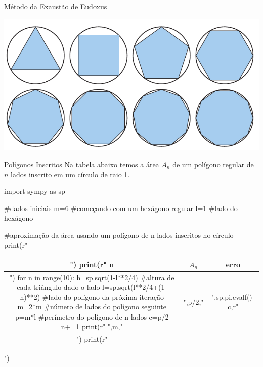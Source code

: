 \begin{frame}[label=area-circulo]{Método da Exaustão de Eudoxus}


\begin{center}
\includegraphics[scale=.5]{figuras/circulo-area.png}
\end{center}

\end{frame}

\begin{frame}[label=area-circulo,fragile=singleslide]{Polígonos Inscritos}
Na tabela abaixo temos a área $A_n$ de um polígono regular de $n$ lados inscrito em um círculo de raio 1.
\medskip

\begin{center}
		\begin{pycode}
import sympy as sp

#dados iniciais
m=6 #começando com um hexágono regular
l=1 #lado do hexágono

#aproximação da área usando um polígono de n lados inscritos no círculo
print(r"\begin{tabular}{c|c|c}")
print(r" n &  $A_n$ & erro \\ \hline")
for n in range(10):
 h=sp.sqrt(1-l**2/4) #altura de cada triângulo dado o lado
 l=sp.sqrt(l**2/4+(1-h)**2) #lado do polígono da próxima iteração
 m=2*m  #número de lados do polígono seguinte  
 p=m*l  #perímetro do polígono de n lados 
 c=p/2
 n+=1
 print(r" ",m,"&",p/2,"&",sp.pi.evalf()-c,r"\\")
print(r"\end{tabular}")
		\end{pycode}
\end{center}
\end{frame}




